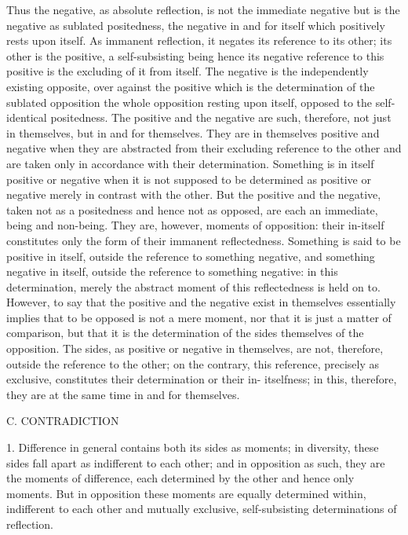 Thus the negative, as absolute reflection, is not the immediate negative
but is the negative as sublated positedness, the negative in and for itself
which positively rests upon itself. As immanent reflection, it negates its
reference to its other; its other is the positive, a self-subsisting being
hence its negative reference to this positive is the excluding of it from
itself. The negative is the independently existing opposite, over against the
positive which is the determination of the sublated opposition  the whole
opposition resting upon itself, opposed to the self-identical positedness.
The positive and the negative are such, therefore, not just in themselves,
but in and for themselves. They are in themselves positive and negative when
they are abstracted from their excluding reference to the other and are taken
only in accordance with their determination. Something is in itself positive
or negative when it is not supposed to be determined as positive or negative
merely in contrast with the other. But the positive and the negative, taken
not as a positedness and hence not as opposed, are each an immediate, being
and non-being. They are, however, moments of opposition: their in-itself
constitutes only the form of their immanent reflectedness. Something is
said to be positive in itself, outside the reference to something negative, and
something negative in itself, outside the reference to something negative: in
this determination, merely the abstract moment of this reflectedness is held
on to. However, to say that the positive and the negative exist in themselves
essentially implies that to be opposed is not a mere moment, nor that it is
just a matter of comparison, but that it is the determination of the sides
themselves of the opposition. The sides, as positive or negative in themselves,
are not, therefore, outside the reference to the other; on the contrary, this
reference, precisely as exclusive, constitutes their determination or their in-
itselfness; in this, therefore, they are at the same time in and for themselves.

C. CONTRADICTION

1. Difference in general contains both its sides as moments;
in diversity, these sides fall apart as indifferent to each other;
and in opposition as such, they are the moments of difference,
each determined by the other and hence only moments.
But in opposition these moments are equally determined within,
indifferent to each other and mutually exclusive, self-subsisting
determinations of reflection.


